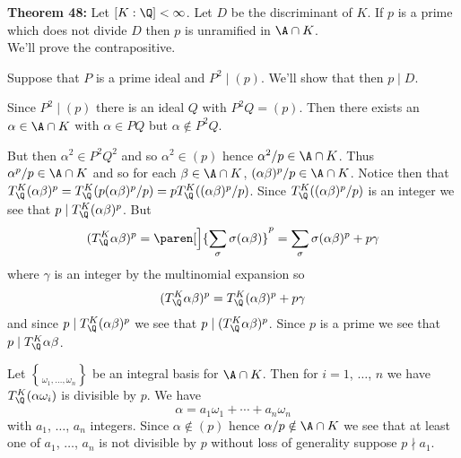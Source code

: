 \textbf{Theorem 48:} Let $[K:\Q]<\infty$.  Let $D$ be the discriminant of $K$.  If $p$ is a prime which does not divide $D$ then $p$ is unramified in $\A\cap K$. \\
\pf We'll prove the contrapositive.

Suppose that $P$ is a prime ideal and $P^2\mid(p)$.  We'll show that then $p\mid D$.

Since $P^2\mid(p)$ there is an ideal $Q$ with $P^2Q=(p)$.  Then there exists an $\alpha\in\A\cap K$ with $\alpha\in PQ$ but $\alpha\notin P^2Q$.

But then $\alpha^2\in P^2Q^2$ and so $\alpha^2\in(p)$ hence $\alpha^2/p\in\A\cap K$.  Thus $\alpha^p/p\in\A\cap K$ and so for each $\beta\in\A\cap K$, $(\alpha\beta)^p/p\in\A\cap K$.  Notice then that $T_\Q^K(\alpha\beta)^p=T_\Q^K(p(\alpha\beta)^p/p)=pT_\Q^K((\alpha\beta)^p/p)$.  Since $T_\Q^K((\alpha\beta)^p/p)$ is an integer we see that $p\mid T_\Q^K(\alpha\beta)^p$.  But
\[ (T_\Q^K\alpha\beta)^p = \paren[\Big]{\sum_\sigma\sigma(\alpha\beta)}^p = \sum_\sigma \sigma(\alpha\beta)^p + p\gamma \]
where $\gamma$ is an integer by the multinomial expansion so
\[ (T_\Q^K\alpha\beta)^p = T_\Q^K(\alpha\beta)^p + p\gamma \]
and since $p\mid T_\Q^K(\alpha\beta)^p$ we see that $p\mid(T_\Q^K\alpha\beta)^p$.  Since $p$ is a prime we see that $p\mid T_\Q^K\alpha\beta$.

Let $\brace{\omega_1,\dotsc,\omega_n}$ be an integral basis for $\A\cap K$.  Then for $i=1$, $\dotsc$, $n$ we have $T_\Q^K(\alpha\omega_i)$ is divisible by $p$.  We have
\[ \alpha = a_1\omega_1 + \dotsb + a_n\omega_n \]
with $a_1$, $\dotsc$, $a_n$ integers.  Since $\alpha\notin(p)$ hence $\alpha/p\notin\A\cap K$ we see that at least one of $a_1$, $\dotsc$, $a_n$ is not divisible by $p$ without loss of generality suppose $p\nmid a_1$.

